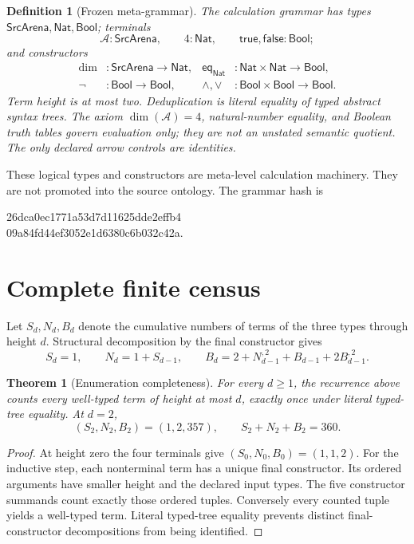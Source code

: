 \documentclass[11pt]{article}
\newtheorem{definition}{Definition}
\newtheorem{theorem}{Theorem}
\newcommand{\Src}{\mathsf{SrcArena}}
\newcommand{\Nat}{\mathsf{Nat}}
\newcommand{\Bool}{\mathsf{Bool}}
\begin{document}
\begin{definition}[Frozen meta-grammar]
The calculation grammar has types \(\Src,\Nat,\Bool\); terminals
\[
  \mathcal A:\Src,\qquad 4:\Nat,\qquad
  \mathsf{true},\mathsf{false}:\Bool;
\]
and constructors
\[
\begin{aligned}
 \dim &: \Src\to\Nat, &
 \mathsf{eq}_{\Nat}&:\Nat\times\Nat\to\Bool,\\
 \neg&:\Bool\to\Bool, &
 \wedge,\vee&:\Bool\times\Bool\to\Bool.
\end{aligned}
\]
Term height is at most two.  Deduplication is literal equality of typed
abstract syntax trees.  The axiom \(\dim(\mathcal A)=4\), natural-number
equality, and Boolean truth tables govern evaluation only; they are not an
unstated semantic quotient.  The only declared arrow controls are identities.
\end{definition}

These logical types and constructors are meta-level calculation machinery.
They are not promoted into the source ontology.  The grammar hash is
\begin{flushleft}
\small\ttfamily
26dca0ec1771a53d7d11625dde2effb4\\
09a84fd44ef3052e1d6380c6b032c42a.
\end{flushleft}

\section{Complete finite census}

Let \(S_d,N_d,B_d\) denote the cumulative numbers of terms of the three types
through height \(d\).  Structural decomposition by the final constructor gives
\[
 S_d=1,\qquad N_d=1+S_{d-1},\qquad
 B_d=2+N_{d-1}^{,2}+B_{d-1}+2B_{d-1}^{,2}.
\]

\begin{theorem}[Enumeration completeness]
For every \(d\geq 1\), the recurrence above counts every well-typed term of
height at most \(d\), exactly once under literal typed-tree equality.  At
\(d=2\),
\[
 (S_2,N_2,B_2)=(1,2,357),\qquad S_2+N_2+B_2=360.
\]
\end{theorem}

\begin{proof}
At height zero the four terminals give \((S_0,N_0,B_0)=(1,1,2)\).  For the
inductive step, each nonterminal term has a unique final constructor.  Its
ordered arguments have smaller height and the declared input types.  The five
constructor summands count exactly those ordered tuples.  Conversely every
counted tuple yields a well-typed term.  Literal typed-tree equality prevents
distinct final-constructor decompositions from being identified.
\end{proof}
\end{document}
